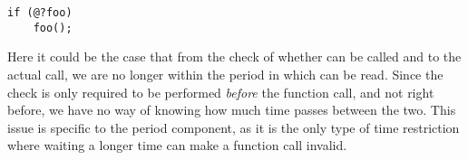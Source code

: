 \begin{lstlisting}[style=dlmc]
  if (@?foo)
    foo();
\end{lstlisting}

Here it could be the case that from the check of whether  can be called and to the actual call, we are no longer within the period in which  can be read.
Since the check is only required to be performed \emph{before} the function call, and not right before, we have no way of knowing how much time passes between the two.
This issue is specific to the period component, as it is the only type of time restriction where waiting a longer time can make a function call invalid.

